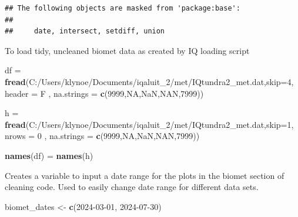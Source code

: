 \documentclass[
]{article}
\newenvironment{Shaded}{\begin{snugshade}}{\end{snugshade}}
\newcommand{\AttributeTok}[1]{\textcolor[rgb]{0.13,0.29,0.53}{#1}}
\newcommand{\DecValTok}[1]{\textcolor[rgb]{0.00,0.00,0.81}{#1}}
\newcommand{\FunctionTok}[1]{\textcolor[rgb]{0.13,0.29,0.53}{\textbf{#1}}}
\newcommand{\NormalTok}[1]{#1}
\newcommand{\OtherTok}[1]{\textcolor[rgb]{0.56,0.35,0.01}{#1}}
\newcommand{\StringTok}[1]{\textcolor[rgb]{0.31,0.60,0.02}{#1}}
\begin{document}
\begin{verbatim}
## The following objects are masked from 'package:base':
## 
##     date, intersect, setdiff, union
\end{verbatim}

To load tidy, uncleaned biomet data as created by IQ loading script

\begin{Shaded}
\begin{Highlighting}[]
\NormalTok{df }\OtherTok{=} \FunctionTok{fread}\NormalTok{(}\StringTok{\textquotesingle{}C:/Users/klynoe/Documents/iqaluit\_2/met/IQtundra2\_met.dat\textquotesingle{}}\NormalTok{,}\AttributeTok{skip=}\DecValTok{4}\NormalTok{, }\AttributeTok{header =}\NormalTok{ F}
\NormalTok{           , }\AttributeTok{na.strings =} \FunctionTok{c}\NormalTok{(}\StringTok{\textquotesingle{}{-}9999\textquotesingle{}}\NormalTok{,}\StringTok{\textquotesingle{}NA\textquotesingle{}}\NormalTok{,}\StringTok{\textquotesingle{}NaN\textquotesingle{}}\NormalTok{,}\StringTok{\textquotesingle{}NAN\textquotesingle{}}\NormalTok{,}\StringTok{\textquotesingle{}{-}7999\textquotesingle{}}\NormalTok{))}

\NormalTok{h }\OtherTok{=} \FunctionTok{fread}\NormalTok{(}\StringTok{\textquotesingle{}C:/Users/klynoe/Documents/iqaluit\_2/met/IQtundra2\_met.dat\textquotesingle{}}\NormalTok{,}\AttributeTok{skip=}\DecValTok{1}\NormalTok{, }\AttributeTok{nrows =} \DecValTok{0}\NormalTok{ ,}
          \AttributeTok{na.strings =} \FunctionTok{c}\NormalTok{(}\StringTok{\textquotesingle{}{-}9999\textquotesingle{}}\NormalTok{,}\StringTok{\textquotesingle{}NA\textquotesingle{}}\NormalTok{,}\StringTok{\textquotesingle{}NaN\textquotesingle{}}\NormalTok{,}\StringTok{\textquotesingle{}NAN\textquotesingle{}}\NormalTok{,}\StringTok{\textquotesingle{}{-}7999\textquotesingle{}}\NormalTok{))}

\FunctionTok{names}\NormalTok{(df) }\OtherTok{=} \FunctionTok{names}\NormalTok{(h)}
\end{Highlighting}
\end{Shaded}

Creates a variable to input a date range for the plots in the biomet
section of cleaning code. Used to easily change date range for different
data sets.

\begin{Shaded}
\begin{Highlighting}[]
\NormalTok{biomet\_dates }\OtherTok{\textless{}{-}} \FunctionTok{c}\NormalTok{(}\StringTok{\textquotesingle{}2024{-}03{-}01\textquotesingle{}}\NormalTok{, }\StringTok{\textquotesingle{}2024{-}07{-}30\textquotesingle{}}\NormalTok{)}
\end{Highlighting}
\end{Shaded}
\end{document}
